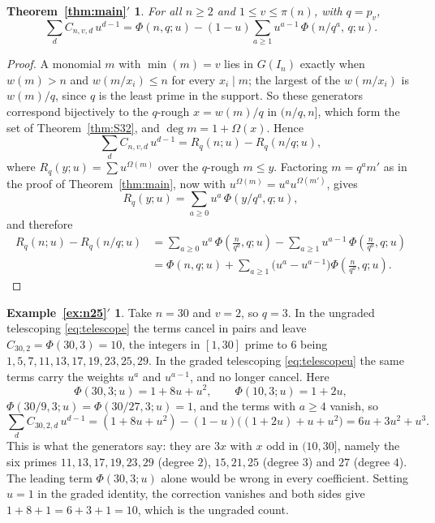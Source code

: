 \documentclass[a4paper,11pt,oneside,reqno]{amsart}
\theoremstyle{definition}
\newtheorem*{exampleprime}{Example~\ref*{ex:n25}\({}'\)}
\theoremstyle{remark}
\theoremstyle{plain}
\newtheorem*{thmmainu}{Theorem~\ref*{thm:main}\({}'\)}
\newcommand{\Om}{\Omega}
\begin{document}
\begin{thmmainu}
  For all \(n \ge 2\) and \(1 \le v \le \pi(n)\), with \(q = p_v\),
  \begin{equation}\label{eq:graded}
    \sum_{d}C_{n,v,d}\,u^{d-1}
      = \Phi(n,q;u)-(1-u)\sum_{a \ge 1}u^{a-1}\,\Phi\!\left(n/q^{a},\,q;u\right).
  \end{equation}
\end{thmmainu}

\begin{proof}
  A monomial \(m\) with \(\min(m) = v\) lies in \(G(I_n)\) exactly when
  \(w(m) > n\) and \(w(m/x_i) \le n\) for every \(x_i \mid m\); the largest of the
  \(w(m/x_i)\) is \(w(m)/q\), since \(q\) is the least prime in the support. So
  these generators correspond bijectively to the \(q\)-rough \(x = w(m)/q\) in
  \((n/q,n]\), which form the set of Theorem~\ref{thm:S32}, and
  \(\deg m = 1+\Om(x)\).
  Hence
  \[
    \sum_{d}C_{n,v,d}\,u^{d-1} = R_q(n;u)-R_q(n/q;u),
  \]
  where \(R_q(y;u) = \sum u^{\Om(m)}\) over the \(q\)-rough \(m \le y\). Factoring
  \(m = q^{a}m'\) as in the proof of Theorem~\ref{thm:main}, now with
  \(u^{\Om(m)} = u^{a}u^{\Om(m')}\), gives
  \[
    R_q(y;u) = \sum_{a \ge 0}u^{a}\,\Phi(y/q^{a},q;u),
  \]
  and therefore
  \begin{equation}\label{eq:telescopeu}
  \begin{split}
    R_q(n;u)-R_q(n/q;u)
      &= \sum_{a \ge 0}u^{a}\,\Phi\!\left(\frac{n}{q^{a}},q;u\right)
        -\sum_{a \ge 1}u^{a-1}\,\Phi\!\left(\frac{n}{q^{a}},q;u\right)\\
      &= \Phi(n,q;u)+\sum_{a \ge 1}\bigl(u^{a}-u^{a-1}\bigr)
        \Phi\!\left(\frac{n}{q^{a}},q;u\right).
  \end{split}
  \end{equation}
\end{proof}

\begin{exampleprime}
  Take \(n = 30\) and \(v = 2\), so \(q = 3\). In the ungraded telescoping
  \eqref{eq:telescope} the terms cancel in pairs and leave
  \(C_{30,2} = \Phi(30,3) = 10\), the integers in \([1,30]\) prime to \(6\)
  being \(1,5,7,11,13,17,19,23,25,29\). In the graded telescoping
  \eqref{eq:telescopeu} the same terms carry the weights \(u^{a}\) and
  \(u^{a-1}\), and no longer cancel. Here
  \[
    \Phi(30,3;u) = 1+8u+u^{2},\qquad \Phi(10,3;u) = 1+2u,
  \]
  \(\Phi(30/9,3;u) = \Phi(30/27,3;u) = 1\), and the terms with \(a \ge 4\)
  vanish, so
  \[
    \sum_{d}C_{30,2,d}\,u^{d-1}
      = (1+8u+u^{2})-(1-u)\bigl((1+2u)+u+u^{2}\bigr)
      = 6u+3u^{2}+u^{3}.
  \]
  This is what the generators say: they are \(3x\) with \(x\) odd in
  \((10,30]\), namely the six primes \(11,13,17,19,23,29\) (degree \(2\)),
  \(15,21,25\) (degree \(3\)) and \(27\) (degree \(4\)). The leading term
  \(\Phi(30,3;u)\) alone would be wrong in every coefficient. Setting \(u = 1\)
  in the graded identity, the correction vanishes and both sides give
  \(1+8+1 = 6+3+1 = 10\), which is the ungraded count.
\end{exampleprime}
\end{document}
